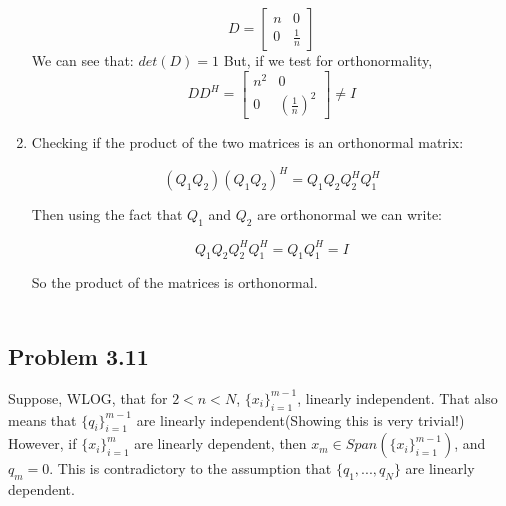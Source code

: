 \documentclass[letterpaper,12pt]{article}
\theoremstyle{definition}
\begin{document}
\begin{spacing}{1.3}{}
\begin{enumerate}
	\[D =
	\begin{bmatrix}
	n & 0 \\
	0 & \frac{1}{n}
	\end{bmatrix}
	\]
	We can see that:
	$det(D) = 1$
	But, if we test for orthonormality,
	\[DD^{H} =
	\begin{bmatrix}
	n^2 & 0 \\
	0 & (\frac{1}{n})^{2}
	\end{bmatrix} \neq I
	\]

	\item

	Checking if the product of the two matrices is an orthonormal matrix:

	$$(Q_1Q_2)(Q_1Q_2)^H = Q_1Q_2Q_2^HQ_1^H$$

	Then using the fact that $Q_1$ and $Q_2$ are orthonormal we can write:

	$$Q_1Q_2Q_2^HQ_1^H = Q_1Q_1^H = I$$

	So the product of the matrices is orthonormal. \\\\

\end{enumerate}


\subsection*{Problem 3.11}

	Suppose, WLOG, that for $2 < n < N$, $\{x_i \}_{i=1}^{m-1}$, linearly independent. That also means that $\{q_i\}_{i=1}^{m-1} $ are linearly independent(Showing this is very trivial!) \\
	However, if $\{x_i \}_{i=1}^{m}$ are linearly dependent, then $x_m \in Span(\{x_i \}_{i=1}^{m-1})$, and $q_m = 0$. This is contradictory to the assumption that $\{q_1, ..., q_N\}$ are linearly dependent.


\end{spacing}
\end{document}
